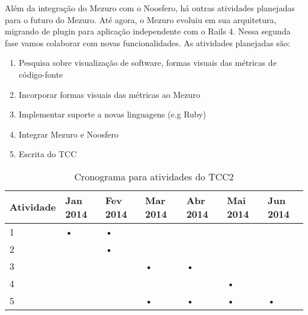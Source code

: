 Além da integração do Mezuro com o Noosfero, há outras atividades planejadas para o futuro do Mezuro. Até agora, o Mezuro evoluiu em sua arquitetura, migrando de plugin para aplicação independente com o Rails 4. Nessa segunda fase vamos colaborar com novas funcionalidades. As atividades planejadas são:

\begin{enumerate}
\item Pesquisa sobre visualização de software, formas visuais das métricas de código-fonte
\item Incorporar formas visuais das métricas ao Mezuro
\item Implementar suporte a novas linguagens (e.g Ruby)
\item Integrar Mezuro e Noosfero
\item Escrita do TCC
\end{enumerate}

\begin{table}[H]
\begin{center}
    \begin{tabular}{ | l | l | l | l | l | l | l |}
    \hline
    Atividade & Jan 2014 & Fev 2014 & Mar 2014 & Abr 2014 & Mai 2014 & Jun 2014 \\ \hline
    1 & • & • & & & & \\ \hline
    2 & & • & & & & \\ \hline
    3 & & & • & • & & \\ \hline
    4 & & & & & • & \\ \hline
    5 & & & • & • & • & • \\ \hline
    \end{tabular}
    \caption{Cronograma para atividades do TCC2}
    \label{tab-cronograma}
\end{center}
\end{table}